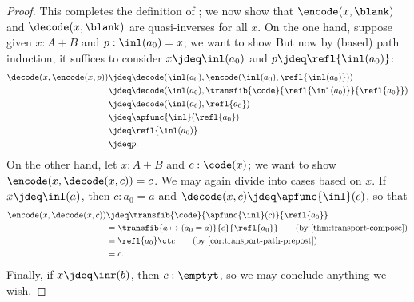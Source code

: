 \begin{proof}
  This completes the definition of \decode; we now show that $\encode(x,{\blank})$ and $\decode(x,{\blank})$ are quasi-inverses for all $x$.
  On the one hand, suppose given $x:A+B$ and $p:\inl(a_0)=x$; we want to show
  But now by (based) path induction, it suffices to consider $x\jdeq\inl(a_0)$ and $p\jdeq \refl{\inl(a_0)}$:
  \begin{align*}
    \decode(x,\encode(x,p))
    &\jdeq \decode(\inl(a_0),\encode(\inl(a_0),\refl{\inl(a_0)}))\\
    &\jdeq \decode(\inl(a_0),\transfib{\code}{\refl{\inl(a_0)}}{\refl{a_0}})\\
    &\jdeq \decode(\inl(a_0),\refl{a_0})\\
    &\jdeq \apfunc{\inl}(\refl{a_0})\\
    &\jdeq \refl{\inl(a_0)}\\
    &\jdeq p.
  \end{align*}
  On the other hand, let $x:A+B$ and $c:\code(x)$; we want to show $\encode(x,\decode(x,c))=c$.
  We may again divide into cases based on $x$.
  If $x\jdeq\inl(a)$, then $c:a_0=a$ and $\decode(x,c)\jdeq \apfunc{\inl}(c)$, so that
  \begin{align}
    \encode(x,\decode(x,c))
    &\jdeq \transfib{\code}{\apfunc{\inl}(c)}{\refl{a_0}}
    \notag\\
    &= \transfib{a\mapsto (a_0=a)}{c}{\refl{a_0}}
    \tag{by \cref{thm:transport-compose}}\\
    &= \refl{a_0} \ct c
    \tag{by \cref{cor:transport-path-prepost}}\\
    &= c. \notag
  \end{align}
  Finally, if $x\jdeq \inr(b)$, then $c:\emptyt$, so we may conclude anything we wish.
\end{proof}
